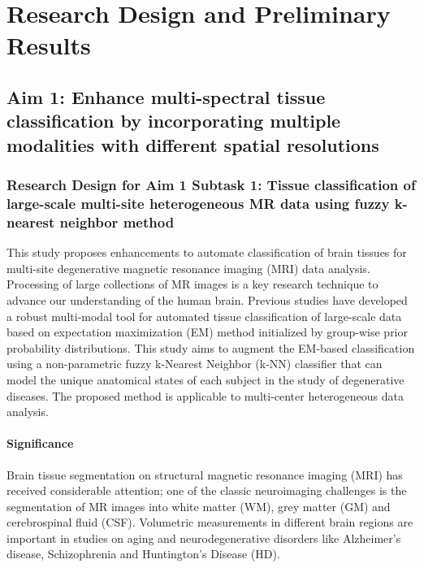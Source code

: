 \section{Research Design and Preliminary Results}

\subsection{Aim 1: Enhance multi-spectral tissue classification by incorporating multiple modalities with different spatial resolutions}
\label{section:Aim1ResearchDesign}

\subsubsection{Research Design for Aim 1 Subtask 1: Tissue classification of large-scale multi-site heterogeneous MR data using fuzzy k-nearest neighbor method}
\label{section:Aim1Subtask1ResearchDesign}

This study proposes enhancements to automate classification of brain tissues for multi-site degenerative magnetic resonance imaging (MRI) data analysis.
Processing of large collections of MR images is a key research technique to advance our understanding of the human brain. Previous studies have developed a robust multi-modal tool for automated tissue classification of large-scale data based on expectation maximization (EM) method initialized by group-wise prior probability distributions.
This study aims to augment the EM-based classification using a non-parametric fuzzy k-Nearest Neighbor (k-NN) classifier that can model the unique anatomical states of each subject in the study of degenerative diseases. The proposed method is applicable to multi-center heterogeneous data analysis.

\paragraph{Significance}

Brain tissue segmentation on structural magnetic resonance imaging (MRI) has received considerable attention; one of the classic neuroimaging challenges is the segmentation of MR images into white matter (WM), grey matter (GM) and cerebrospinal fluid (CSF).
Volumetric measurements in different brain regions are important in studies on aging and neurodegenerative disorders \cite{vrooman2013auto} like Alzheimer's disease, Schizophrenia and Huntington's Disease (HD).

